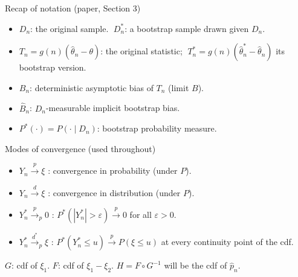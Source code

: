 \documentclass[10pt,aspectratio=169]{beamer}
\theoremstyle{plain}
\newcommand{\Pstar}{P^{*}}
\newcommand{\dto}{\xrightarrow{d}}
\newcommand{\pto}{\xrightarrow{p}}
\newcommand{\dstarto}{\xrightarrow{d^{*}}}
\newcommand{\Tn}{T_{n}}
\newcommand{\Tns}{T_{n}^{*}}
\newcommand{\Bn}{B_{n}}
\newcommand{\Bnh}{\hat{B}_{n}}
\newcommand{\thn}{\hat{\theta}_{n}}
\newcommand{\thns}{\hat{\theta}_{n}^{*}}
\newcommand{\pnh}{\hat{p}_{n}}
\newcommand{\Dn}{D_{n}}
\newcommand{\Dns}{D_{n}^{*}}
\begin{document}
\begin{frame}{Recap of notation (paper, Section 3)}

  \begin{itemize}
    \setlength{\itemsep}{6pt}
    \item $\Dn$: the original sample.
      $\;\Dns$: a bootstrap sample drawn given $\Dn$.
    \item $\Tn = g(n)(\thn - \theta)$: the original statistic;
      $\;\Tns = g(n)(\thns - \thn)$ its bootstrap version.
    \item $\Bn$: deterministic asymptotic bias of $\Tn$ (limit $B$).
    \item $\Bnh$: $\Dn$-measurable \alert{implicit} bootstrap bias.
    \item $\Pstar(\cdot) = P(\cdot \mid \Dn)$: bootstrap probability measure.
  \end{itemize}

  \medskip

  \begin{block}{Modes of convergence (used throughout)}
    \footnotesize
    \begin{itemize}
      \setlength{\itemsep}{2pt}
      \item $Y_n \pto \xi$ \;: convergence in probability (under $P$).
      \item $Y_n \dto \xi$ \;: convergence in distribution (under $P$).
      \item $Y_n^* \pto_p 0$ \;: $\Pstar(|Y_n^*|>\varepsilon) \pto 0$ for all $\varepsilon > 0$.
      \item $Y_n^* \dstarto_p \xi$ \;: $\Pstar(Y_n^* \le u) \pto P(\xi \le u)$ at every continuity point of the cdf.
    \end{itemize}
  \end{block}

  \footnotesize
  $G$: cdf of $\xi_1$. \;$F$: cdf of $\xi_1 - \xi_2$. \;$H = F\circ G^{-1}$ will be the cdf of $\pnh$.

\end{frame}

\end{document}
